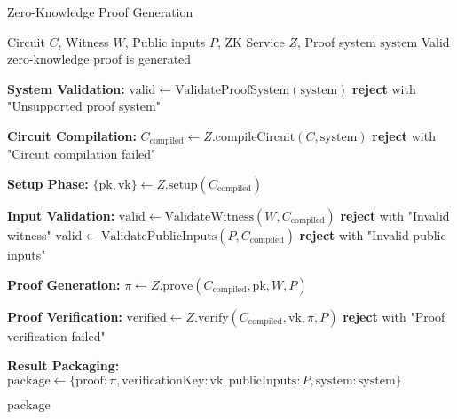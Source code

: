 \begin{tcolorbox}[
    enhanced,
    colback=blue!5!white,
    colframe=blue!75!black,
    arc=5mm,
    boxrule=1.5pt,
    title=Zero-Knowledge Proof Generation Protocol,
    fonttitle=\bfseries,
    coltitle=white,
    attach boxed title to top left={yshift=-2mm, xshift=5mm},
    boxed title style={colback=blue!75!black, rounded corners},
    shadow={2mm}{-2mm}{0mm}{black!50},
    drop fuzzy shadow
]
\begin{protocol}{Zero-Knowledge Proof Generation}
\label{prot:zk-proof-generation}
\begin{algorithmic}[1]
\Require Circuit $C$, Witness $W$, Public inputs $P$, ZK Service $Z$, Proof system $\text{system}$
\Ensure Valid zero-knowledge proof is generated

\State \textbf{System Validation:}
\State $\text{valid} \gets \text{ValidateProofSystem}(\text{system})$
    \State \textbf{reject} with "Unsupported proof system"
\EndIf

\State \textbf{Circuit Compilation:}
\State $C_{\text{compiled}} \gets Z.\text{compileCircuit}(C, \text{system})$
    \State \textbf{reject} with "Circuit compilation failed"
\EndIf

\State \textbf{Setup Phase:}
\State $\{\text{pk}, \text{vk}\} \gets Z.\text{setup}(C_{\text{compiled}})$

\State \textbf{Input Validation:}
\State $\text{valid} \gets \text{ValidateWitness}(W, C_{\text{compiled}})$
    \State \textbf{reject} with "Invalid witness"
\EndIf
\State $\text{valid} \gets \text{ValidatePublicInputs}(P, C_{\text{compiled}})$
    \State \textbf{reject} with "Invalid public inputs"
\EndIf

\State \textbf{Proof Generation:}
\State $\pi \gets Z.\text{prove}(C_{\text{compiled}}, \text{pk}, W, P)$

\State \textbf{Proof Verification:}
\State $\text{verified} \gets Z.\text{verify}(C_{\text{compiled}}, \text{vk}, \pi, P)$
    \State \textbf{reject} with "Proof verification failed"
\EndIf

\State \textbf{Result Packaging:}
\State $\text{package} \gets \{\text{proof}: \pi, \text{verificationKey}: \text{vk}, \text{publicInputs}: P, \text{system}: \text{system}\}$

\State \Return $\text{package}$
\end{algorithmic}
\end{protocol}
\end{tcolorbox}
